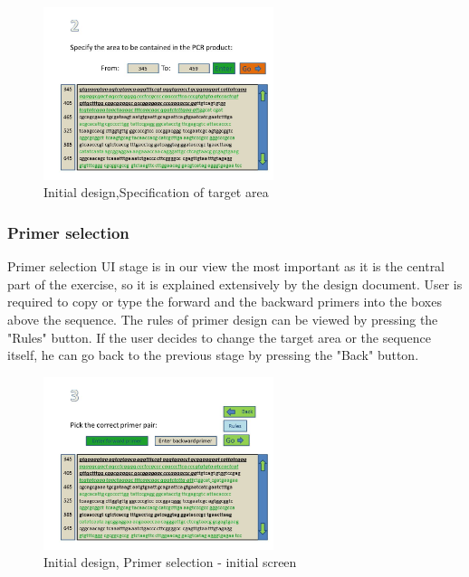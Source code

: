 \begin{figure}[h]
  \begin{center}
	\includegraphics[width=0.6\textwidth]{./images/UiDes/Slide2.JPG}
    \caption{
      \label{fig:UiDes:slide2}
      Initial design,Specification of target area
    }
  \end{center}
\end{figure}

\subsubsection{Primer selection}
Primer selection UI stage is in our view the most important as it is the central part of the exercise, so it is explained extensively by the design document. User is required to copy or type the forward and the backward primers into the boxes above the sequence. The rules of primer design can be viewed by pressing the "Rules" button. If the user decides to change the target area or the sequence itself, he can go back to the previous stage by pressing the "Back" button. 

\begin{figure}[h]
  \begin{center}
	\includegraphics[width=0.6\textwidth]{./images/UiDes/slide3.jpg}
    \caption{
      \label{fig:UiDes:slide3}
      Initial design, Primer selection - initial screen
    }
  \end{center}
\end{figure}



